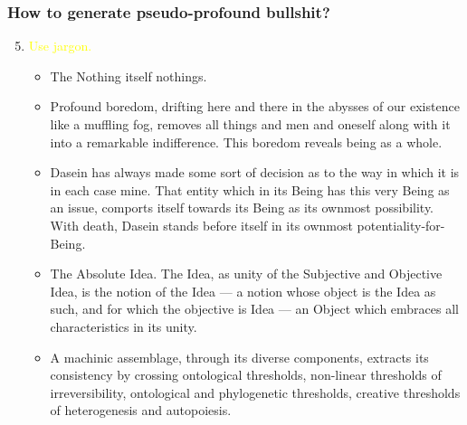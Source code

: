 \documentclass[UTF8,11pt,colorlinks,compress,openany]{beamer}%
\begin{document}
\begin{frame}\frametitle{How to generate pseudo-profound bullshit?}\vspace{-3pt}
	\begin{enumerate}\setcounter{enumi}{4}
		\item \textcolor{yellow}{Use jargon.}
		\begin{itemize}
			\item The Nothing itself nothings.
			\item Profound boredom, drifting here and there in the abysses of our existence like a muffling fog, removes all things and men and oneself along with it into a remarkable indifference. This boredom reveals being as a whole.
			\item Dasein has always made some sort of decision as to the way in which it is in each case mine. That entity which in its Being has this very Being as an issue, comports itself towards its Being as its ownmost possibility. With death, Dasein stands before itself in its ownmost potentiality-for-Being.
			\item The Absolute Idea. The Idea, as unity of the Subjective and Objective Idea, is the notion of the Idea --- a notion whose object is the Idea as such, and for which the objective is Idea --- an Object which embraces all characteristics in its unity.
			\item A machinic assemblage, through its diverse components, extracts its consistency by crossing ontological thresholds, non-linear thresholds of irreversibility, ontological and phylogenetic thresholds, creative thresholds of heterogenesis and autopoiesis.
		\end{itemize}
	\end{enumerate}
\end{frame}
\end{document}
